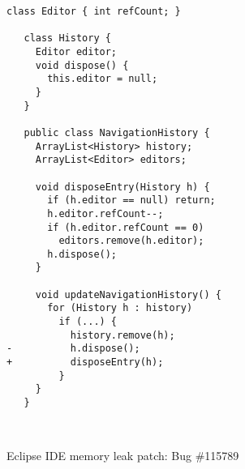 \begin{figure}[p]
\begin{center}
\begin{minipage}{0.6\textwidth}
\begin{lstlisting}[frame=single]
   class Editor { int refCount; }

   class History {
     Editor editor;
     void dispose() {
       this.editor = null;
     }
   }

   public class NavigationHistory {
     ArrayList<History> history;
     ArrayList<Editor> editors;

     void disposeEntry(History h) {
       if (h.editor == null) return;
       h.editor.refCount--;
       if (h.editor.refCount == 0)
         editors.remove(h.editor);
       h.dispose();
     }

     void updateNavigationHistory() {
       for (History h : history)
         if (...) {
           history.remove(h);
-          h.dispose();
+          disposeEntry(h);
         }
     }
   }
\end{lstlisting}
\end{minipage} \\
\caption{Eclipse IDE memory leak patch: Bug \#115789\label{fig:115789-patch}}
\end{center}
\end{figure}
